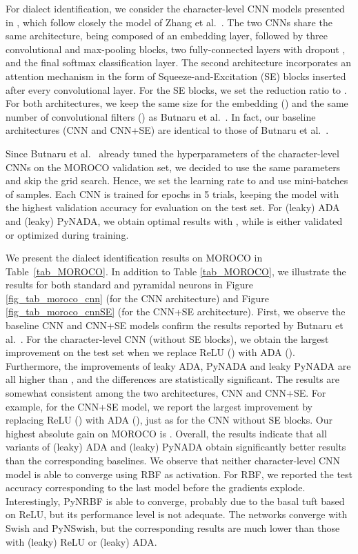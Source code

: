 \documentclass[pdflatex,sn-mathphys]{sn-jnl}
\theoremstyle{thmstyleone}
\theoremstyle{thmstyletwo}\newtheorem{example}{Example}\newtheorem{remark}{Remark}
\theoremstyle{thmstylethree}\newtheorem{definition}{Definition}\DeclareMathOperator{\sinc}{sinc}
\begin{document}
For dialect identification, we consider the character-level CNN models presented in \citep{Butnaru-ACL-2019}, which follow closely the model of Zhang et al.~\cite{Zhang-NIPS-2015}. The two CNNs share the same architecture, being composed of an embedding layer, followed by three convolutional and max-pooling blocks, two fully-connected layers with dropout , and the final softmax classification layer. The second architecture incorporates an attention mechanism in the form of Squeeze-and-Excitation (SE) blocks \citep{Hu-CVPR-2018} inserted after every convolutional layer. For the SE blocks, we set the reduction ratio to . For both architectures, we keep the same size for the embedding () and the same number of convolutional filters () as Butnaru et al.~\cite{Butnaru-ACL-2019}. In fact, our baseline architectures (CNN and CNN+SE) are identical to those of Butnaru et al.~\cite{Butnaru-ACL-2019}.

Since Butnaru et al.~\cite{Butnaru-ACL-2019} already tuned the hyperparameters of the character-level CNNs on the MOROCO validation set, we decided to use the same parameters and skip the grid search. Hence, we set the learning rate to  and use mini-batches of  samples. Each CNN is trained for  epochs in 5 trials, keeping the model with the highest validation accuracy for evaluation on the test set. For (leaky) ADA and (leaky) PyNADA, we obtain optimal results with , while  is either validated or optimized during training.

We present the dialect identification results on MOROCO in Table~\ref{tab_MOROCO}. In addition to Table \ref{tab_MOROCO}, we illustrate the results for both standard and pyramidal neurons in Figure \ref{fig_tab_moroco_cnn} (for the CNN \cite{Butnaru-ACL-2019} architecture) and Figure \ref{fig_tab_moroco_cnnSE} (for the CNN+SE {\cite{Butnaru-ACL-2019}} architecture). First, we observe the baseline CNN and CNN+SE models confirm the results reported by Butnaru et al.~\cite{Butnaru-ACL-2019}. For the character-level CNN (without SE blocks), we obtain the largest improvement on the test set when we replace ReLU () with ADA (). Furthermore, the improvements of leaky ADA, PyNADA and leaky PyNADA are all higher than , and the differences are statistically significant. The results are somewhat consistent among the two architectures, CNN and CNN+SE. For example, for the CNN+SE model, we report the largest improvement by replacing ReLU () with ADA (), just as for the CNN without SE blocks. Our highest absolute gain on MOROCO is . Overall, the results indicate that all variants of (leaky) ADA and (leaky) PyNADA obtain significantly better results than the corresponding baselines. We observe that neither character-level CNN model is able to converge using RBF as activation. For RBF, we reported the test accuracy corresponding to the last model before the gradients explode. Interestingly, PyNRBF is able to converge, probably due to the basal tuft based on ReLU, but its performance level is not adequate. The networks converge with Swish and PyNSwish, but the corresponding results are much lower than those with (leaky) ReLU or (leaky) ADA. 
\end{document}
